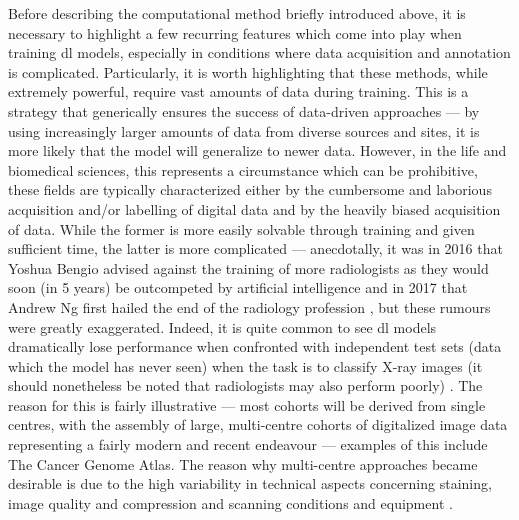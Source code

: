 Before describing the computational method briefly introduced above, it is necessary to highlight a few recurring features which come into play when training \ac{dl} models, especially in conditions where data acquisition and annotation is complicated. Particularly, it is worth highlighting that these methods, while extremely powerful, require vast amounts of data during training. This is a strategy that generically ensures the success of data-driven approaches --- by using increasingly larger amounts of data from diverse sources and sites, it is more likely that the model will generalize to newer data. However, in the life and biomedical sciences, this represents a circumstance which can be prohibitive, these fields are typically characterized either by the cumbersome and laborious acquisition and/or labelling of digital data and by the heavily biased acquisition of data. While the former is more easily solvable through training and given sufficient time, the latter is more complicated --- anecdotally, it was in 2016 that Yoshua Bengio advised against the training of more radiologists as they would soon (in 5 years) be outcompeted by artificial intelligence \cite{Creative_Destruction_Lab2016-zf} and in 2017 that Andrew Ng first hailed the end of the radiology profession \cite{Ng2017-tz}, but these rumours were greatly exaggerated. Indeed, it is quite common to see \ac{dl} models dramatically lose performance when confronted with independent test sets (data which the model has never seen) when the task is to classify X-ray images (it should nonetheless be noted that radiologists may also perform poorly) \cite{Rajpurkar2021-bj}. The reason for this is fairly illustrative --- most cohorts will be derived from single centres, with the assembly of large, multi-centre cohorts of digitalized image data representing a fairly modern and recent endeavour --- examples of this include The Cancer Genome Atlas. The reason why multi-centre approaches became desirable is due to the high variability in technical aspects concerning staining, image quality and compression and scanning conditions and equipment \cite{Van_der_Laak2021-id}.

